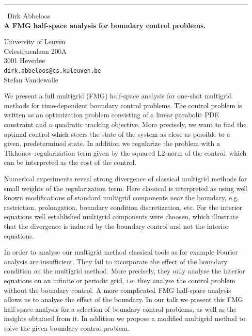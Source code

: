 \documentclass{report}
\begin{document}
\begin{center}
\rule{6in}{1pt} \
{\large Dirk Abbeloos \\
{\bf A FMG half-space analysis for boundary control problems.}}

University of Leuven \\ Celestijnenlaan 200A \\ 3001 Heverlee
\\
{\tt dirk.abbeloos@cs.kuleuven.be}\\
Stefan Vandewalle\end{center}

We present a full multigrid (FMG) half-space analysis for one-shot
multigrid methods for time-dependent boundary control problems. The
control problem is written as an optimization problem consisting of a
linear parabolic PDE constraint and a quadratic tracking objective. More
precisely, we want to find the optimal control which steers the state of
the system as close as
possible to a given, predetermined state. In addition we regularize the
problem with a Tikhonov regularization term given by the squared L2-norm
of the control, which can be interpreted as the cost of the control.

Numerical experiments reveal strong divergence of classical multigrid
methods for small weights of the regularization term. Here classical is
interpreted as using well known modifications of standard multigrid
components near the boundary, e.g. restriction, prolongation, boundary
condition discretization, etc. For the interior equations well
established multigrid components were choosen, which illustrate that the
divergence is induced by the boundary control and not the interior
equations.

In order to analyse our multigrid method classical tools as for example
Fourier analysis are insufficient. They fail to incorporate the effect of
the boundary condition on the multigrid method. More precisely, they only
analyse the interior equations on an infinite or periodic grid, i.e. they
analyse the control problem without the boundary control. A more
complicated FMG half-space analysis allows us to analyse the effect of
the boundary. In our talk we present this FMG half-space analysis for a
selection of boundary control problems, as well as the insights obtained
from it. In addition we propose a modified multigrid method to solve the
given boundary control problem.
\end{document}

